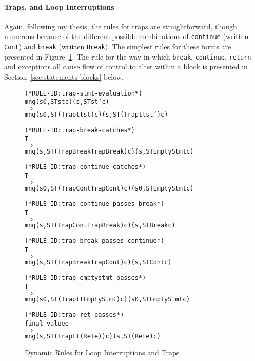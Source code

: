 \documentclass[11pt]{article}
\begin{document}
\paragraph{Traps, and Loop Interruptions}
%
%
%
%
%
%
Again, following my thesis, the rules for traps are straightforward,
though numerous because of the different possible combinations of
\texttt{continue} (written \texttt{Cont}) and \texttt{break} (written
\texttt{Break}).  The simplest rules for these forms are presented in
Figure~\ref{fig:traps}.  The rule for the way in which \texttt{break},
\texttt{continue}, \texttt{return} and exceptions all cause flow of
control to alter within a block is presented in
Section~\ref{sec:statements-blocks} below.

\begin{figure}[htbp]
%
%
%
%
%
%
%
\begin{alltt}
(* RULE-ID: trap-stmt-evaluation *)
     mng (s0, ST st c) (s, ST st' c)
   \(\Rightarrow\)
     mng (s0, ST (Trap tt st) c) (s, ST (Trap tt st') c)

(* RULE-ID: trap-break-catches *)
     T
   \(\Rightarrow\)
     mng (s, ST (Trap BreakTrap Break) c) (s, ST EmptyStmt c)

(* RULE-ID: trap-continue-catches *)
     T
   \(\Rightarrow\)
     mng (s0, ST (Trap ContTrap Cont) c) (s0, ST EmptyStmt c)

(* RULE-ID: trap-continue-passes-break *)
     T
   \(\Rightarrow\)
     mng (s, ST (Trap ContTrap Break) c) (s, ST Break c)

(* RULE-ID: trap-break-passes-continue *)
     T
   \(\Rightarrow\)
     mng (s, ST (Trap BreakTrap Cont) c) (s, ST Cont c)

(* RULE-ID: trap-emptystmt-passes *)
     T
   \(\Rightarrow\)
     mng (s0, ST (Trap tt EmptyStmt) c) (s0, ST EmptyStmt c)

(* RULE-ID: trap-ret-passes *)
     final_value e
   \(\Rightarrow\)
     mng (s, ST (Trap tt (Ret e)) c) (s, ST (Ret e) c)
\end{alltt}
  \caption{Dynamic Rules for Loop Interruptions and Traps}
  \label{fig:traps}
\end{figure}
\end{document}
